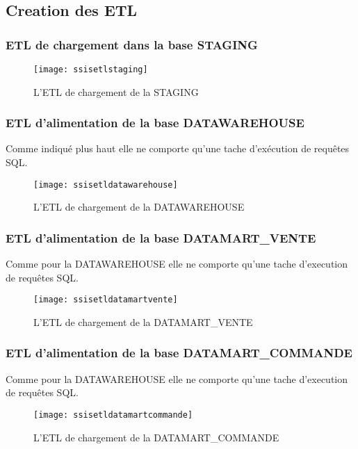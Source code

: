 \subsection{Creation des ETL}
\subsubsection{ETL de chargement dans la base STAGING}

\begin{figure}[H]
    \centering
    \texttt{[image: ssisetlstaging]}
    \caption{L'ETL de chargement de la STAGING}
    \label{fig:ssisetlstaging}
\end{figure}

\subsubsection{ETL d'alimentation de la base DATAWAREHOUSE}
Comme indiqué plus haut elle ne comporte qu'une tache d'exécution de requêtes SQL.

\begin{figure}[H]
    \centering
    \texttt{[image: ssisetldatawarehouse]}
    \caption{L'ETL de chargement de la DATAWAREHOUSE}
    \label{fig:ssisetldatawarehouse}
\end{figure}

\subsubsection{ETL d'alimentation de la base DATAMART\_VENTE}
Comme pour la DATAWAREHOUSE elle ne comporte qu'une tache d'execution de requêtes SQL.
\begin{figure}[H]
    \centering
    \texttt{[image: ssisetldatamartvente]}
    \caption{L'ETL de chargement de la DATAMART\_VENTE}
    \label{fig:ssisetldatamartvente}
\end{figure}

\subsubsection{ETL d'alimentation de la base DATAMART\_COMMANDE}
Comme pour la DATAWAREHOUSE elle ne comporte qu'une tache d'execution de requêtes SQL.
\begin{figure}[H]
    \centering
    \texttt{[image: ssisetldatamartcommande]}
    \caption{L'ETL de chargement de la DATAMART\_COMMANDE}
    \label{fig:ssisetldatamartcommande}
\end{figure}


